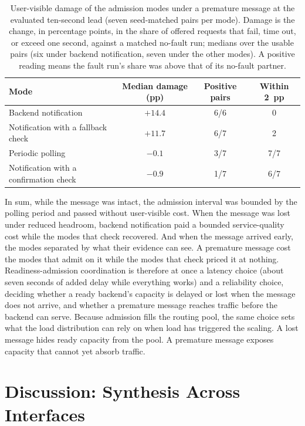 ﻿\documentclass[12pt,reqno,twoside]{amsbook}
\begin{document}
\begin{table}[H]
    \centering
    \caption{User-visible damage of the admission modes under a premature
    message at the evaluated ten-second lead (seven seed-matched pairs per
    mode). Damage is the change, in percentage points, in the share of offered
    requests that fail, time out, or exceed one second, against a matched
    no-fault run; medians over the usable pairs (six under backend
    notification, seven under the other
    modes). A positive
    reading means
    the fault run's share was above that of its no-fault partner.}
    \label{tab:rq3_soundness}
    \footnotesize
    \setlength{\tabcolsep}{4pt}
    \begin{tabular}{p{} c c c}
        \toprule
        Mode & Median damage (pp) & Positive pairs & Within 2~pp \\
        \midrule
        Backend notification & $+14.4$ & 6/6 & 0 \\
        Notification with a fallback check & $+11.7$ & 6/7 & 2 \\
        Periodic polling & $-0.1$ & 3/7 & 7/7 \\
        Notification with a confirmation check & $-0.9$ & 1/7 & 6/7 \\
        \bottomrule
    \end{tabular}
\end{table}

In sum, while the message was intact, the admission interval was bounded by
the polling period and passed without user-visible cost. When the message was
lost under reduced headroom, backend notification paid a bounded
service-quality cost while the modes that check recovered. And when the message
arrived early, the modes separated by what their evidence can see. A premature
message cost the modes that admit on it while the modes that check priced it at
nothing. Readiness-admission coordination is therefore at once a latency choice
(about seven seconds of added delay while everything works) and a reliability
choice, deciding whether a ready backend's capacity is delayed or lost when the
message does not arrive, and whether a premature message reaches traffic before
the backend can serve. Because admission fills the routing pool, the same choice
sets what the load distribution can rely on when load has triggered the
scaling. A lost message hides ready capacity from the pool. A premature message
exposes capacity that cannot yet absorb traffic.


\section{Discussion: Synthesis Across Interfaces}\label{sec:discussion}
\end{document}

